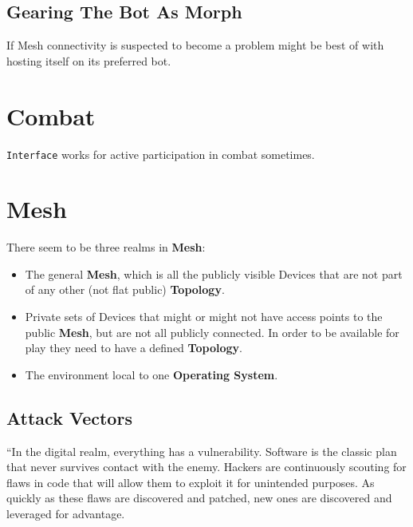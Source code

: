\subsection{Gearing The Bot As Morph}

If \gls{Mesh} connectivity is suspected to become a problem \texttt{\egr{}}\index{\egr{}} might be best of with hosting itself on its preferred bot.


\section{Combat}

\texttt{Interface} works for active participation in combat sometimes.  \citep[p. 50]{ep2e_1.1_2019}


\section{Mesh}

There seem to be three realms in \textbf{\gls{Mesh}}:
\begin{itemize}
    \item The general \textbf{\gls{Mesh}}, which is all the publicly visible Devices that are not part of any other (not flat public) \textbf{\gls{Topology}}.
    \item Private sets of Devices that might or might not have access points to the public \textbf{\gls{Mesh}}, but are not all publicly connected. In order to be available for play they need to have a defined \textbf{\gls{Topology}}.
    \item The environment local to one \textbf{\gls{Operating System}}.
\end{itemize}

\subsection{Attack Vectors}

“In the digital realm, everything has a vulnerability. Software is the classic plan that never survives contact with the enemy. Hackers are continuously scouting for flaws in code that will allow them to exploit it for unintended purposes. As quickly as these flaws are discovered and patched, new ones are discovered and leveraged for advantage.

